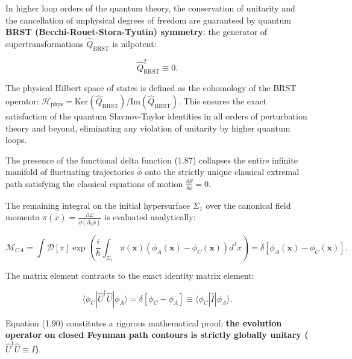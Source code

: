 \documentclass[11pt,a4paper]{article}
\theoremstyle{definition}
\begin{document}
\begin{enumerate}
In higher loop orders of the quantum theory, the conservation of unitarity and the cancellation of unphysical degrees of freedom are guaranteed by quantum \textbf{BRST (Becchi-Rouet-Stora-Tyutin) symmetry}: the generator of supertransformations $\hat{Q}_{\text{BRST}}$ is nilpotent:

\begin{equation}\label{eq:1.88}\tag{1.88}
\hat{Q}_{\text{BRST}}^2 \equiv 0.
\end{equation}

The physical Hilbert space of states is defined as the cohomology of the BRST operator: $\mathcal{H}_{\text{phys}} = \text{Ker}(\hat{Q}_{\text{BRST}}) / \text{Im}(\hat{Q}_{\text{BRST}})$. This ensures the exact satisfaction of the quantum Slavnov-Taylor identities in all orders of perturbation theory and beyond, eliminating any violation of unitarity by higher quantum loops.

The presence of the functional delta function (1.87) collapses the entire infinite manifold of fluctuating trajectories $\bar{\phi}$ onto the strictly unique classical extremal path satisfying the classical equations of motion $\frac{\delta S}{\delta \phi} = 0$.

The remaining integral on the initial hypersurface $\Sigma_1$ over the canonical field momenta $\pi(x) = \frac{\partial\mathcal{L}}{\partial(\partial_0\phi)}$ is evaluated analytically:

\begin{equation}\label{eq:1.89}\tag{1.89}
\mathcal{M}_{CA} = \int \mathcal{D}[\pi] \exp\left( \frac{i}{\hbar} \int_{\Sigma_1} \pi(\mathbf{x}) \left( \phi_A(\mathbf{x}) - \phi_C(\mathbf{x}) \right) d^3x \right) = \delta\left[ \phi_A(\mathbf{x}) - \phi_C(\mathbf{x}) \right].
\end{equation}

The matrix element contracts to the exact identity matrix element:

\begin{equation}\label{eq:1.90}\tag{1.90}
\langle \phi_C | \hat{U}^\dagger \hat{U} | \phi_A \rangle = \delta[\phi_C - \phi_A] \equiv \langle \phi_C | \hat{I} | \phi_A \rangle.
\end{equation}

Equation (1.90) constitutes a rigorous mathematical proof: \textbf{the evolution operator on closed Feynman path contours is strictly globally unitary ($\hat{U}^\dagger \hat{U} \equiv \hat{I}$)}.
\end{enumerate}
\end{document}
